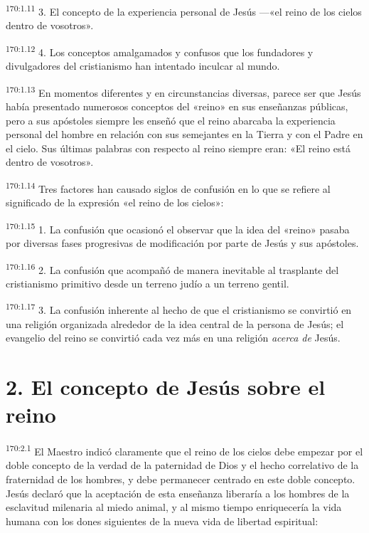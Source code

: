 \par 
\textsuperscript{170:1.11} 3. El concepto de la experiencia personal de Jesús ---«el reino de los cielos dentro de vosotros».

\par 
\textsuperscript{170:1.12} 4. Los conceptos amalgamados y confusos que los fundadores y divulgadores del cristianismo han intentado inculcar al mundo.

\par 
\textsuperscript{170:1.13} En momentos diferentes y en circunstancias diversas, parece ser que Jesús había presentado numerosos conceptos del «reino» en sus enseñanzas públicas, pero a sus apóstoles siempre les enseñó que el reino abarcaba la experiencia personal del hombre en relación con sus semejantes en la Tierra y con el Padre en el cielo. Sus últimas palabras con respecto al reino siempre eran: «El reino está dentro de vosotros».

\par 
\textsuperscript{170:1.14} Tres factores han causado siglos de confusión en lo que se refiere al significado de la expresión «el reino de los cielos»:

\par 
\textsuperscript{170:1.15} 1. La confusión que ocasionó el observar que la idea del «reino» pasaba por diversas fases progresivas de modificación por parte de Jesús y sus apóstoles.

\par 
\textsuperscript{170:1.16} 2. La confusión que acompañó de manera inevitable al trasplante del cristianismo primitivo desde un terreno judío a un terreno gentil.

\par 
\textsuperscript{170:1.17} 3. La confusión inherente al hecho de que el cristianismo se convirtió en una religión organizada alrededor de la idea central de la persona de Jesús; el evangelio del reino se convirtió cada vez más en una religión \textit{acerca de} Jesús.

\section*{2. El concepto de Jesús sobre el reino}
\par 
\textsuperscript{170:2.1} El Maestro indicó claramente que el reino de los cielos debe empezar por el doble concepto de la verdad de la paternidad de Dios y el hecho correlativo de la fraternidad de los hombres, y debe permanecer centrado en este doble concepto. Jesús declaró que la aceptación de esta enseñanza liberaría a los hombres de la esclavitud milenaria al miedo animal, y al mismo tiempo enriquecería la vida humana con los dones siguientes de la nueva vida de libertad espiritual:

